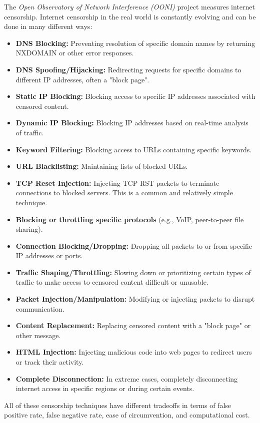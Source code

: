 The \textit{Open Observatory of Network Interference (OONI)} \cite{OONI} project measures internet censorship.
Internet censorship in the real world is constantly evolving and can be done in many different ways:
\begin{itemize}
	\item \noindent\textbf{DNS Blocking:} Preventing resolution of specific domain names by returning NXDOMAIN or other error responses.
	\item \noindent\textbf{DNS Spoofing/Hijacking:} Redirecting requests for specific domains to different IP addresses, often a "block page".
	\item \noindent\textbf{Static IP Blocking:} Blocking access to specific IP addresses associated with censored content.
	\item \noindent\textbf{Dynamic IP Blocking:} Blocking IP addresses based on real-time analysis of traffic.
	\item \noindent\textbf{Keyword Filtering:} Blocking access to URLs containing specific keywords.
	\item \noindent\textbf{URL Blacklisting:} Maintaining lists of blocked URLs.
	\item \noindent\textbf{TCP Reset Injection:} Injecting TCP RST packets to terminate connections to blocked servers. This is a common and relatively simple technique.
	\item \noindent\textbf{Blocking or throttling specific protocols} (e.g., VoIP, peer-to-peer file sharing).
	\item \noindent\textbf{Connection Blocking/Dropping:} Dropping all packets to or from specific IP addresses or ports.
	\item \noindent\textbf{Traffic Shaping/Throttling:} Slowing down or prioritizing certain types of traffic to make access to censored content difficult or unusable.
	\item \noindent\textbf{Packet Injection/Manipulation:} Modifying or injecting packets to disrupt communication.
	\item \noindent\textbf{Content Replacement:} Replacing censored content with a "block page" or other message.
	\item \noindent\textbf{HTML Injection:} Injecting malicious code into web pages to redirect users or track their activity.
	\item \noindent\textbf{Complete Disconnection:} In extreme cases, completely disconnecting internet access in specific regions or during certain events.
\end{itemize}
All of these censorship techniques have different tradeoffs in terms of false positive rate, false negative rate, ease of circumvention, and computational cost.

